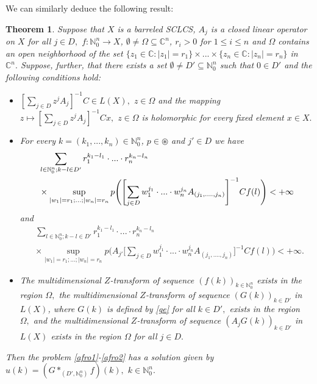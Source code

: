 \documentclass{amsart}
\newtheorem{thm}{Theorem}[section]
\theoremstyle{definition}
\theoremstyle{remark}
\numberwithin{equation}{section}
\begin{document}
We can similarly deduce the following result:

\begin{thm}\label{moves1}
Suppose that $X$ is a barreled \emph{SCLCS}, $A_{j}$ is a closed linear operator on $X$ for all $j\in D,$ $f: {\mathbb N}_{0}^{n} \rightarrow X$, $\emptyset \neq \Omega \subseteq {\mathbb C}^{n}$, $r_{i}>0$ for $1\leq i\leq n$ and $\Omega$ contains an open neighborhood of the set $\{z_{1}\in {\mathbb C} : |z_{1}|=r_{1}\} \times ... \times \{z_{n}\in {\mathbb C} : |z_{n}|=r_{n}\}$ in ${\mathbb C}^{n}.$ 
Suppose, further, that there exists a set $\emptyset \neq D' \subseteq {\mathbb N}_{0}^{n}$ such that $0\in D'$ and the following conditions hold:
\begin{itemize}
\item[(i)] $[\sum_{j\in D}z^{j}A_{j}]^{-1}C\in L(X),$ $z\in \Omega$ and the mapping $z\mapsto [\sum_{j\in D}z^{j}A_{j}]^{-1}Cx,$ $z\in \Omega$ is holomorphic for every fixed element $x\in X.$
\item[(ii)] For every $k=(k_{1},...,k_{n})\in {\mathbb N}_{0}^{n}$, $p\in \circledast $ and $j'\in D$ we have
\begin{align*} & 
\sum_{l\in {\mathbb N}_{0}^{n}; k-l\in D'}r_{1}^{k_{1}-l_{1}}\cdot ... \cdot r_{n}^{k_{n}-l_{n}} \\ \notag &  \times \sup_{|w_{1}|=r_{1};...;|w_{n}|=r_{n}} p\Biggl( \Biggl[\sum_{j\in D}w_{1}^{j_{1}}\cdot ... \cdot w_{n}^{j_{n}}A_{(j_{1},....,j_{n})}\Biggr]^{-1}Cf(l)\Biggr) <+\infty
\end{align*}
and
\begin{align*} &
\sum_{l\in {\mathbb N}_{0}^{n}; k-l\in D'}r_{1}^{k_{1}-l_{1}}\cdot ... \cdot r_{n}^{k_{n}-l_{n}}
\\& \times \sup_{|w_{1}|=r_{1};...;|w_{n}|=r_{n}} p\Biggl( A_{j'}\Biggl[\sum_{j\in D}w_{1}^{j_{1}}\cdot ... \cdot w_{n}^{j_{n}}A_{(j_{1},....,j_{n})}\Biggr]^{-1}Cf(l)\Biggr) <+\infty .
\end{align*}
\item[(iii)] The multidimensional $Z$-transform of sequence $(f(k))_{k\in {\mathbb N}_{0}^{n}}$ exists in the region $\Omega ,$ the multidimensional $Z$-transform of sequence $(G(k))_{k\in D'}$  in $L(X)$, where $G(k)$ is defined by \eqref{ge} for all $k\in D',$ exists in the region $\Omega ,$ and the multidimensional $Z$-transform of sequence $(A_{j}G(k))_{k\in D'}$ in $L(X)$ exists in the region $\Omega$ for all $j\in D.$
\end{itemize} 
Then the problem \eqref{afro1}-\eqref{afro2} has a solution given by $u(k)= (G\ast_{(D',{\mathbb N}_{0}^{n})} f)(k),$ $k\in {\mathbb N}_{0}^{n}.$ 
\end{thm} 
\end{document}
